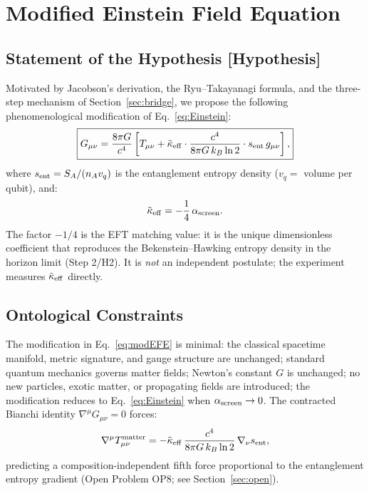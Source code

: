 \documentclass[12pt]{article}
\newcommand{\hypothesis}{\textbf{[Hypothesis]}}
\begin{document}
\section{Modified Einstein Field Equation}
\label{sec:EFE}

\subsection{Statement of the Hypothesis \hypothesis}

Motivated by Jacobson's derivation, the Ryu--Takayanagi formula, and the three-step
mechanism of Section~\ref{sec:bridge}, we propose the following phenomenological
modification of Eq.~\eqref{eq:Einstein}:
\begin{equation}
\boxed{
G_{\mu\nu} = \frac{8\pi G}{c^4}\left[
T_{\mu\nu}
+ \tilde{\kappa}_{\rm eff}\cdot\frac{c^4}{8\pi G\,k_B\ln 2}\cdot s_{\rm ent}\,g_{\mu\nu}
\right],}
\label{eq:modEFE}
\end{equation}
where $s_{\rm ent} = S_A/(n_A v_q)$ is the entanglement entropy density
($v_q =$ volume per qubit), and:
\begin{equation}
\tilde{\kappa}_{\rm eff} = -\frac{1}{4}\,\alpha_{\rm screen}.
\label{eq:kappa_eff}
\end{equation}
The factor $-1/4$ is the EFT matching value: it is the unique dimensionless coefficient
that reproduces the Bekenstein--Hawking entropy density in the horizon limit (Step 2/H2).
It is \emph{not} an independent postulate; the experiment measures $\tilde{\kappa}_{\rm eff}$
directly.

\subsection{Ontological Constraints}

The modification in Eq.~\eqref{eq:modEFE} is minimal:
the classical spacetime manifold, metric signature, and gauge structure are unchanged;
standard quantum mechanics governs matter fields;
Newton's constant $G$ is unchanged;
no new particles, exotic matter, or propagating fields are introduced;
the modification reduces to Eq.~\eqref{eq:Einstein} when $\alpha_{\rm screen}\to 0$.
The contracted Bianchi identity $\nabla^\mu G_{\mu\nu} = 0$ forces:
\begin{equation}
\nabla^\mu T^{\rm matter}_{\mu\nu}
= -\tilde{\kappa}_{\rm eff}\,\frac{c^4}{8\pi G\,k_B\ln 2}\,\nabla_\nu s_{\rm ent},
\label{eq:Bianchi}
\end{equation}
predicting a composition-independent fifth force proportional to the entanglement
entropy gradient (Open Problem OP8; see Section~\ref{sec:open}).
\end{document}
